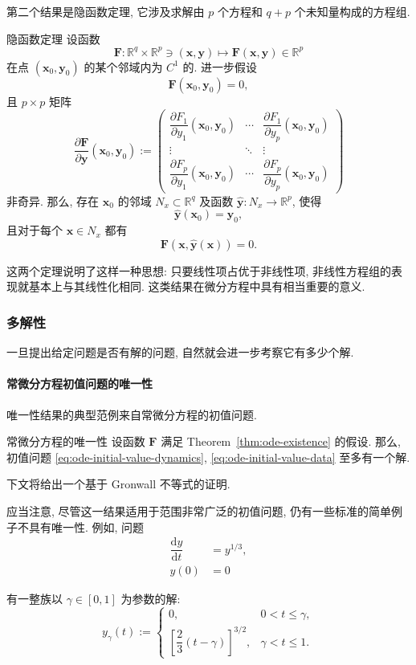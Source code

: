 第二个结果是隐函数定理, 它涉及求解由 $p$ 个方程和 $q+p$ 个未知量构成的方程组.

\begin{Theorem}{隐函数定理}
\label{thm:implicit-function}
设函数
\[
\bm{F}:\mathbb{R}^q\times\mathbb{R}^p\ni(\bm{x},\bm{y})\mapsto\bm{F}(\bm{x},\bm{y})\in\mathbb{R}^p
\]
在点 $(\bm{x}_0,\bm{y}_0)$ 的某个邻域内为 $C^1$ 的. 进一步假设
\[
\bm{F}(\bm{x}_0,\bm{y}_0)=0,
\]
且 $p\times p$ 矩阵
\[
\dfrac{\partial\bm{F}}{\partial\bm{y}}(\bm{x}_0,\bm{y}_0):=
\begin{pmatrix}
\dfrac{\partial F_1}{\partial y_1}(\bm{x}_0,\bm{y}_0)&\cdots&\dfrac{\partial F_1}{\partial y_p}(\bm{x}_0,\bm{y}_0)\\
\vdots&\ddots&\vdots\\
\dfrac{\partial F_p}{\partial y_1}(\bm{x}_0,\bm{y}_0)&\cdots&\dfrac{\partial F_p}{\partial y_p}(\bm{x}_0,\bm{y}_0)
\end{pmatrix}
\]
非奇异. 那么, 存在 $\bm{x}_0$ 的邻域 $N_x\subset\mathbb{R}^q$ 及函数 $\hat{\bm{y}}:N_x\to\mathbb{R}^p$, 使得
\[
\hat{\bm{y}}(\bm{x}_0)=\bm{y}_0,
\]
且对于每个 $\bm{x}\in N_x$ 都有
\[
\bm{F}(\bm{x},\hat{\bm{y}}(\bm{x}))=0.
\]
\end{Theorem}

这两个定理说明了这样一种思想: 只要线性项占优于非线性项, 非线性方程组的表现就基本上与其线性化相同. 这类结果在微分方程中具有相当重要的意义.

\subsubsection{多解性}\label{subsec:multiplicity}

一旦提出给定问题是否有解的问题, 自然就会进一步考察它有多少个解.

\paragraph*{常微分方程初值问题的唯一性}

唯一性结果的典型范例来自常微分方程的初值问题.

\begin{Theorem}{常微分方程的唯一性}
\label{thm:ode-uniqueness}
设函数 $\bm{F}$ 满足 Theorem~\ref{thm:ode-existence} 的假设. 那么, 初值问题 \eqref{eq:ode-initial-value-dynamics}, \eqref{eq:ode-initial-value-data} 至多有一个解.
\end{Theorem}

下文将给出一个基于 Gronwall 不等式的证明.

应当注意, 尽管这一结果适用于范围非常广泛的初值问题, 仍有一些标准的简单例子不具有唯一性. 例如, 问题
\[
\begin{aligned}
\dfrac{\mathrm{d}y}{\mathrm{d}t}&=y^{1/3},\\
y(0)&=0
\end{aligned}
\]

有一整族以 $\gamma\in[0,1]$ 为参数的解:
\[
y_\gamma(t):=\begin{cases}
0,&0<t\leq\gamma,\\
\left[\dfrac{2}{3}(t-\gamma)\right]^{3/2},&\gamma<t\leq1.
\end{cases}
\]
